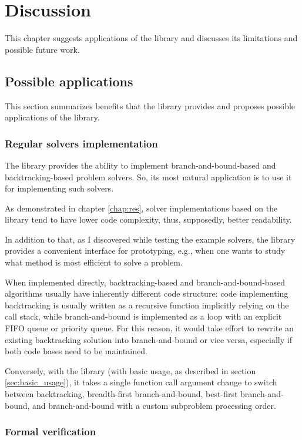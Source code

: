 \chapter{Discussion}
\label{chap:discuss}

This chapter suggests applications of the library and discusses its limitations
and possible future work.

\section{Possible applications}

This section summarizes benefits that the library provides and proposes possible applications
of the library.

\subsection{Regular solvers implementation}

The library provides the ability to implement branch-and-bound-based and backtracking-based
problem solvers. So, its most natural application is to use it for implementing such solvers.

As demonstrated in chapter \ref{chap:res}, solver implementations based on the library
tend to have lower code complexity, thus, supposedly, better readability.

In addition to that, as I discovered while testing the example solvers,
the library provides a convenient interface for prototyping, e.g., when one wants to study
what method is most efficient to solve a problem.

When implemented directly,
backtracking-based and branch-and-bound-based algorithms usually have inherently different
code structure: code implementing backtracking is usually written as a recursive function
implicitly relying on the call stack, while branch-and-bound is implemented as a loop
with an explicit FIFO queue or priority queue. For this reason, it would take effort
to rewrite an existing backtracking solution into branch-and-bound or vice versa, especially
if both code bases need to be maintained.

Conversely, with the library (with basic usage, as described in section
\ref{sec:basic_usage}), it takes a single function call argument change to switch between
backtracking, breadth-first branch-and-bound, best-first branch-and-bound, and
branch-and-bound with a custom subproblem processing order.

\subsection{Formal verification}

